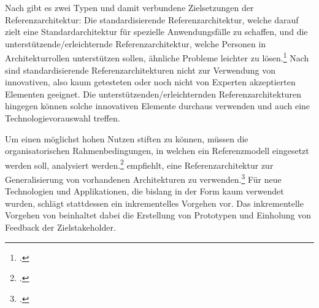 Nach \citeauthor{Angelov.2012} gibt es zwei Typen und damit verbundene Zielsetzungen der Referenzarchitektur: Die standardisierende Referenzarchitektur, welche darauf zielt eine Standardarchitektur für spezielle Anwendungsfälle zu schaffen, und die unterstützende/erleichternde Referenzarchitektur, welche Personen in Architekturrollen unterstützen sollen, ähnliche Probleme leichter zu lösen.\footcite[Vgl. auch im Folgenden][S.~422~ff.]{Angelov.2012} Nach \citeauthor{Angelov.2012} sind standardisierende Referenzarchitekturen nicht zur Verwendung von innovativen, also kaum getesteten oder noch nicht von Experten akzeptierten Elementen geeignet. Die unterstützenden/erleichternden Referenzarchitekturen hingegen können solche innovativen Elemente durchaus verwenden und auch eine Technologievorauswahl treffen.

Um einen möglichst hohen Nutzen stiften zu können, müssen die organisatorischen Rahmenbedingungen, in welchen ein Referenzmodell eingesetzt werden soll, analysiert werden.\footcite[Vgl.][]{vomBrocke.2004}
\citeauthor{Muller.2020} empfiehlt, eine Referenzarchitektur zur Generalisierung von vorhandenen Architekturen zu verwenden.\footcite[Vgl. auch im Folgenden][7]{Muller.2020} Für neue Technologien und Applikationen, die bislang in der Form kaum verwendet wurden, schlägt \citeauthor{Muller.2020} stattdessen ein inkrementelles Vorgehen vor. Das inkrementelle Vorgehen von \citeauthor{Muller.2020} beinhaltet dabei die Erstellung von Prototypen und Einholung von Feedback der Zielstakeholder. 

